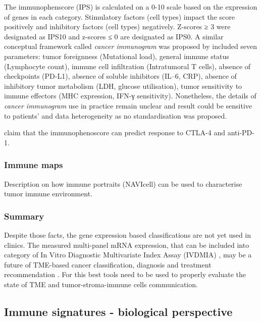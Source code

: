 \documentclass[12pt,]{book}
\theoremstyle{definition}
\theoremstyle{definition}
\theoremstyle{definition}
\theoremstyle{remark}
\begin{document}
The immunophenscore (IPS) is calculated on a 0-10 scale based on the
expression of genes in each category. Stimulatory factors (cell types)
impact the score positively and inhibitory factors (cell types)
negatively. Z-scores ≥ 3 were designated as IPS10 and z-scores ≤ 0 are
designated as IPS0. A similar conceptual framework called \emph{cancer
immunogram} was proposed by \citet{Blank2016} included seven parameters:
tumor foreignness (Mutational load), general immune status (Lymphocyte
count), immune cell infiltration (Intratumoral T cells), absence of
checkpoints (PD-L1), absence of soluble inhibitors (IL--6, CRP), absence
of inhibitory tumor metabolism (LDH, glucose utilisation), tumor
sensitivity to immune effectors (MHC expression, IFN-γ sensitivity).
Nonetheless, the details of \emph{cancer immunogram} use in practice
remain unclear and result could be sensitive to patients' and data
heterogeneity as no standardisation was proposed.

\citet{Charoentong2017} claim that the immunophenoscore can predict
response to CTLA-4 and anti-PD-1.

\hypertarget{immune-maps}{%
\subsubsection{Immune maps}\label{immune-maps}}

Description on how immune portraits (NAVIcell) can be used to
characterise tumor immune environment.

\hypertarget{summary}{%
\subsubsection{Summary}\label{summary}}

Despite those facts, the gene expression based classifications are not
yet used in clinics. The measured multi-panel mRNA expression, that can
be included into category of In Vitro Diagnostic Multivariate Index
Assay (IVDMIA) \citep{Gyorffy2015, Ross2008}, may be a future of
TME-based cancer classification, diagnosis and treatment recommendation
\citep{Gnjatic2017}. For this best tools need to be used to properly
evaluate the state of TME and tumor-stroma-immune cells communication.

\hypertarget{immune-signatures}{%
\subsection{Immune signatures - biological
perspective}\label{immune-signatures}}
\end{document}
